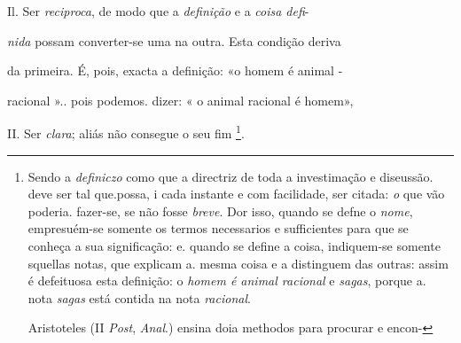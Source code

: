 Il. Ser \emph{reciproca}, de modo que a \emph{definição} e a \emph{coisa defi}-

\emph{nida} possam converter-se uma na outra. Esta condição deriva

da primeira. É, pois, exacta a definição: «o homem é animal -

racional ».. pois podemos. dizer: « o animal racional é homem»,

II. Ser \emph{clara}; aliás não consegue o seu fim \footnote{Sendo a \emph{definiczo} como que a directriz de toda a investimação e diseussão. deve ser tal que.possa, i cada instante e com facilidade, ser citada: \emph{o} que vão poderia. fazer-se, se não fosse \emph{breve}. Dor isso, quando se defne o \emph{nome}, empresuém-se somente os termos necessarios e sufficientes para que se conheça a sua significação: e. quando se define a coisa, indiquem-se somente squellas notas, que explicam a. mesma coisa e a distinguem das outras: assim é defeituosa esta definição: o \emph{homem é animal racional} e \emph{sagas}, porque a. nota \emph{sagas} está contida na nota \emph{racional}.\par Aristoteles (II \emph{Post}, \emph{Anal}.) ensina doia methodos para procurar e encon-}.

